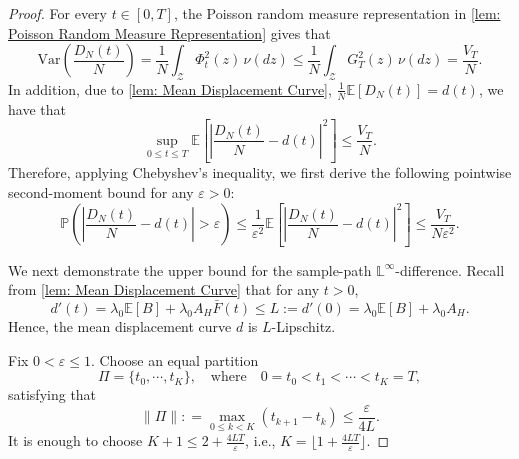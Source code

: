 \documentclass{article}
\theoremstyle{definition}
\newcommand{\E}{\mathbb E}
\newcommand{\pro}{\mathbb P}
\begin{document}
\begin{proof}

    For every $t\in[0,T]$, the Poisson random measure representation in \cref{lem: Poisson Random Measure Representation} gives that
    \begin{equation}
    \label{equ: displacement variance exact}
        \text{Var}\left(\frac{D_N(t)}{N}\right)=\frac{1}{N}\int_{\mathcal Z}\Phi_t^2(z)\,\nu(dz) \leq \frac{1}{N}\int_{\mathcal Z}G_T^2(z)\,\nu(dz) =\frac{V_T}{N}.
    \end{equation}
    In addition, due to \cref{lem: Mean Displacement Curve}, $\frac{1}{N}\E[D_N(t)] = d(t)$, we have that 
    \begin{equation}
        \label{equ: displacement MSE upper bound}
        \sup_{0\leq t\leq T}\E\left[\left|\frac{D_N(t)}{N}-d(t)\right|^2\right]\leq\frac{V_T}{N}.
    \end{equation}
    Therefore, applying Chebyshev's inequality, we first derive the following pointwise second-moment bound for any $\varepsilon>0$:
    \begin{equation*}
        \pro\left(\left|\frac{D_N(t)}{N}-d(t)\right|>\varepsilon\right)\leq\frac{1}{\varepsilon^2}\E\left[\left|\frac{D_N(t)}{N}-d(t)\right|^2\right]\leq\frac{V_T}{N\varepsilon^2}.
    \end{equation*}

    We next demonstrate the upper bound for the sample-path $\mathbb L^\infty$-difference. Recall from \cref{lem: Mean Displacement Curve} that for any $t>0$,
    \begin{equation*}
        d'(t)=\lambda_0\E[B]+\lambda_0A_H \bar F(t) \leq L := d'(0)=\lambda_0\E[B]+\lambda_0A_H.
    \end{equation*}
    Hence, the mean displacement curve $d$ is $L$-Lipschitz.

    Fix $0<\varepsilon\leq1$. Choose an equal partition
    \begin{equation*}
        \Pi = \{t_0,\cdots,t_K\},\quad \text{where}\quad 0=t_0<t_1<\cdots<t_K=T,
    \end{equation*}
    satisfying that
    \begin{equation*}
    \|\Pi\| : =\max_{0\leq k<K}(t_{k+1}-t_k)\leq\frac{\varepsilon}{4 L }.
    \end{equation*}
    It is enough to choose $K+1\leq 2+\frac{4 L T}{\varepsilon}$, i.e., $K=  \lfloor1+\frac{4 L T}{\varepsilon}\rfloor$.


\end{proof}
\end{document}
